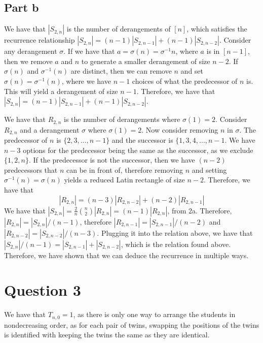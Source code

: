 \documentclass[]{article}
\begin{document}
\subsection{Part b}
We have that $|S_{2, n}|$ is the number of derangements of $[n]$, which satisfies the recurrence relationship $|S_{2, n}| = (n - 1) |S_{2, n-1}| + (n - 1)|S_{2, n-2}|$. Consider any derangement $\sigma$. If we have that $a = \sigma(n) = \sigma^{-1} n$, where $a$ is in $[n-1]$, then we remove $a$ and $n$ to generate a smaller derangement of size $n-2$. If $\sigma(n)$ and $\sigma^{-1}(n)$ are distinct, then we can remove $n$ and set $\sigma(n) = \sigma^{-1}(n)$, where we have $n-1$ choices of what the predecessor of $n$ is. This will yield a derangement of size $n-1$. Therefore, we have that $|S_{2, n}| = (n - 1) |S_{2, n-1}| + (n - 1)|S_{2, n-2}|$.

We have that $R_{2, n}$ is the number of derangements where $\sigma(1) = 2$. Consider $R_{2, n}$ and a derangement $\sigma$ where $\sigma(1) = 2$. Now consider removing $n$ in $\sigma$. The predecessor of $n$ is $\lbrace 2, 3, ..., n-1 \rbrace$ and the successor is $\lbrace 1, 3, 4, ... , n-1$. We have $n-3$ options for the predecessor being the same as the successor, as we exclude $\lbrace 1, 2, n \rbrace$. If the predecessor is not the successor, then we have $(n-2)$ predecessors that $n$ can be in front of, therefore removing $n$ and setting $\sigma^{-1}(n) = \sigma(n)$ yields a reduced Latin rectangle of size $n - 2$. Therefore, we have that
\begin{equation}
	|R_{2, n}| = (n - 3) |R_{2, n - 2}| + (n - 2) |R_{2, n-1}|
\end{equation}
We have that $|S_{2, n}| = \frac{2}{n} \binom{n}{2} |R_{2, n}| = (n-1) |R_{2,n}|$, from 2a. Therefore, $|R_{2, n}| = |S_{2, n}|/(n-1)$, therefore $|R_{2, n-1}| = |S_{2, n-1}|/(n-2)$ and $|R_{2, n-2}| = |S_{2, n-2}|/(n-3)$. Plugging it into the relation above, we have that $|S_{2, n}|/(n-1) = |S_{2, n-1}| + |S_{2, n-2}|$, which is the relation found above. Therefore, we have shown that we can deduce the recurrence in multiple ways. 


\section{Question 3}
We have that $T_{n, 0} = 1$, as there is only one way to arrange the students in nondecreasing order, as for each pair of twins, swapping the positions of the twins is identified with keeping the twins the same as they are identical. 
\end{document}
